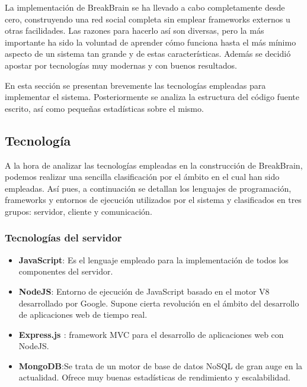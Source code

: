 La implementación de BreakBrain se ha llevado a cabo completamente desde cero, construyendo una red social completa sin emplear frameworks externos u otras facilidades. Las razones para hacerlo así son diversas, pero la más importante ha sido la voluntad de aprender cómo funciona hasta el más mínimo aspecto de un sistema tan grande y de estas características. Además se decidió apostar por tecnologías muy modernas y con buenos resultados.

En esta sección se presentan brevemente las tecnologías empleadas para implementar el sistema. Posteriormente se analiza la estructura del código fuente escrito, así como pequeñas estadísticas sobre el mismo.

\subsection{Tecnología}

A la hora de analizar las tecnologías empleadas en la construcción de BreakBrain, podemos realizar una sencilla clasificación por el ámbito en el cual han sido empleadas. Así pues, a continuación se detallan los lenguajes de programación, frameworks y entornos de ejecución utilizados por el sistema y clasificados en tres grupos: servidor, cliente y comunicación.


\subsubsection{Tecnologías del servidor}

\begin{itemize}
\item {\bf JavaScript}: Es el lenguaje empleado para la implementación de todos los componentes del servidor.
\item {\bf NodeJS}: Entorno de ejecución de JavaScript basado en el motor V8 desarrollado por Google. Supone cierta revolución en el ámbito del desarrollo de aplicaciones web de tiempo real.
\item {\bf Express.js \cite{Visionmedia}}: framework MVC para el desarrollo de aplicaciones web con NodeJS.
\item {\bf MongoDB}:Se trata de un motor de base de datos NoSQL de gran auge en la actualidad. Ofrece muy buenas estadísticas de rendimiento y escalabilidad.
\end{itemize}


